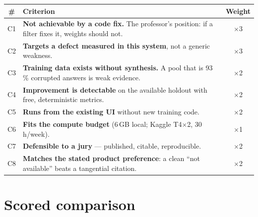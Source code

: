 \documentclass[11pt,a4paper]{article}
\begin{document}
\begin{table}[h]\centering\small
\begin{tabularx}{\textwidth}{c Y c}
\toprule
\textbf{\#} & \textbf{Criterion} & \textbf{Weight} \\
\midrule
C1 & \textbf{Not achievable by a code fix.} The professor's position: if a filter fixes it, weights should not. & $\times$3 \\
 C2 & \textbf{Targets a defect measured in this system}, not a generic weakness. & $\times$3 \\
C3 & \textbf{Training data exists without synthesis.} A pool that is 93\,\% corrupted answers is weak evidence. & $\times$2 \\
 C4 & \textbf{Improvement is detectable} on the available holdout with free, deterministic metrics. & $\times$2 \\
C5 & \textbf{Runs from the existing UI} without new training code. & $\times$2 \\
 C6 & \textbf{Fits the compute budget} (6\,GB local; Kaggle T4$\times$2, 30\,h/week). & $\times$1 \\
C7 & \textbf{Defensible to a jury} --- published, citable, reproducible. & $\times$2 \\
 C8 & \textbf{Matches the stated product preference}: a clean ``not available'' beats a tangential citation. & $\times$2 \\
\bottomrule
\end{tabularx}
\end{table}

\section{Scored comparison}
\end{document}

